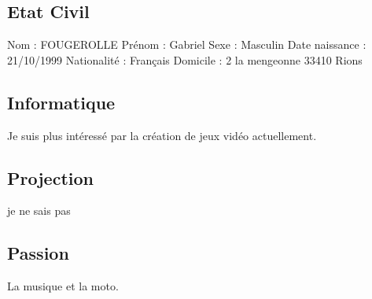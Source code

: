 \documentclass[a4paper,12pt]{article}
\begin{document}
\subsection{Etat Civil}
Nom : FOUGEROLLE
\newline
Prénom : Gabriel
\newline
Sexe : Masculin
\newline
Date naissance : 21/10/1999
\newline
Nationalité : Français
\newline
Domicile : 2 la mengeonne 33410 Rions

\subsection{Informatique}
Je suis plus intéressé par la création de jeux vidéo actuellement.

\subsection{Projection}
je ne sais pas 

\subsection{Passion}
La musique et la moto.
\end{document}
